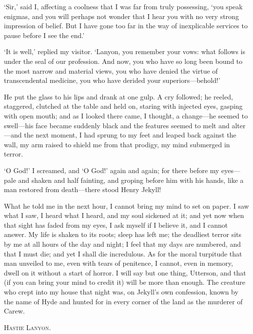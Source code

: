 \documentclass[]{novel}
\begin{document}
‘Sir,’ said I, affecting a coolness that I was far from truly possessing, ‘you speak enigmas, and you will perhaps not wonder that I hear you with no very strong impression of belief. But I have gone too far in the way of inexplicable services to pause before I see the end.’

‘It is well,’ replied my visitor. ‘Lanyon, you remember your vows: what follows is under the seal of our profession. And now, you who have so long been bound to the most narrow and material views, you who have denied the virtue of transcendental medicine, you who have derided your superiors—behold!’

He put the glass to his lips and drank at one gulp. A cry followed; he reeled, staggered, clutched at the table and held on, staring with injected eyes, gasping with open mouth; and as I looked there came, I thought, a change—he seemed to swell—his face became suddenly black and the features seemed to melt and alter—and the next moment, I had sprung to my feet and leaped back against the wall, my arm raised to shield me from that prodigy, my mind submerged in terror.

‘O God!’ I screamed, and ‘O God!’ again and again; for there before my eyes—pale and shaken and half fainting, and groping before him with his hands, like a man restored from death—there stood Henry Jekyll!

What he told me in the next hour, I cannot bring my mind to set on paper. I saw what I saw, I heard what I heard, and my soul sickened at it; and yet now when that sight has faded from my eyes, I ask myself if I believe it, and I cannot answer. My life is shaken to its roots; sleep has left me; the deadliest terror sits by me at all hours of the day and night; I feel that my days are numbered, and that I must die; and yet I shall die incredulous. As for the moral turpitude that man unveiled to me, even with tears of penitence, I cannot, even in memory, dwell on it without a start of horror. I will say but one thing, Utterson, and that (if you can bring your mind to credit it) will be more than enough. The creature who crept into my house that night was, on Jekyll’s own confession, known by the name of Hyde and hunted for in every corner of the land as the murderer of Carew.

\stake\hfill\textsc{Hastie Lanyon.}\hspace{1em}

\clearpage
\label{ch:10}
\begin{ChapterStart}
\vspace*{4\nbs}
\null\vspace{0.75\nbs}
\vspace{0.375\nbs}
\end{ChapterStart}
\end{document}
